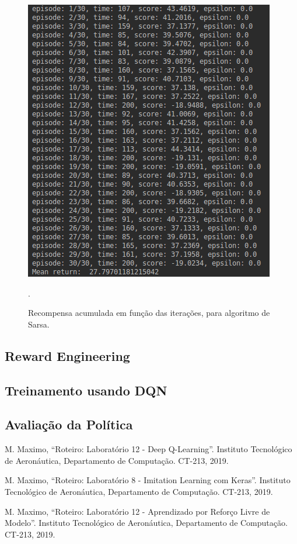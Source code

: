 \documentclass[conference]{IEEEtran}
\begin{document}
\begin{figure}[htbp]
\centering
\centerline{\includegraphics[scale=0.4]{imagens/evaluate_dqn_result.png}}
\caption{Recompensa acumulada em função das iterações, para algoritmo de Sarsa.}.
\label{evaluate_dqn_result}
\end{figure}

	\subsection{Reward Engineering}

	\subsection{Treinamento usando DQN}
	
	\subsection{Avaliação da Política}
	
\begin{thebibliography}{00}
 M. Maximo, ``Roteiro: Laboratório 12 - Deep Q-Learning''. Instituto Tecnológico de Aeronáutica, Departamento de Computação. CT-213, 2019.

 M. Maximo, ``Roteiro: Laboratório 8 - Imitation Learning com Keras''. Instituto Tecnológico de Aeronáutica, Departamento de Computação. CT-213, 2019.

 M. Maximo, ``Roteiro: Laboratório 12 - Aprendizado por Reforço Livre de Modelo''. Instituto Tecnológico de Aeronáutica, Departamento de Computação. CT-213, 2019.

\end{thebibliography}
\end{document}
